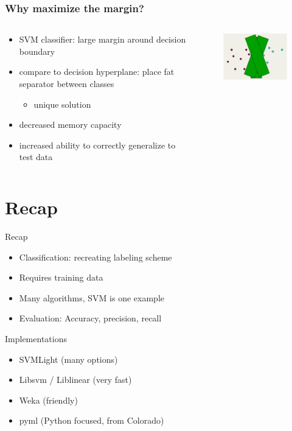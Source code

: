 \documentclass[compress]{beamer}
\newcommand{\1}{\mathbf{1}}
\begin{document}
\begin{frame}
\frametitle{Why maximize the margin?}
\begin{columns}[t]
\begin{column}{5.5cm}
\begin{itemize}
\item SVM classifier: large margin around decision boundary
\item compare to decision hyperplane: place fat separator between classes
\begin{itemize}
\item unique solution
\end{itemize}
\item decreased memory capacity
\item increased ability to correctly generalize to test data
\end{itemize}
\end{column}
\begin{column}{4.5cm}
\begin{figure}
\includegraphics[width=2.0in]{svm/band-aids}
\end{figure}
\end{column}
\end{columns}
\end{frame}


\section{Recap}

\begin{frame}{Recap}

	\begin{itemize}
		\item Classification: recreating labeling scheme
		\item Requires training data
		\item Many algorithms, SVM is one example
		\item Evaluation: Accuracy, precision, recall
	\end{itemize}

\end{frame}

\begin{frame}{Implementations}

		\begin{itemize}
			\item SVMLight (many options)
			\item Libsvm / Liblinear (very fast)
			\item Weka (friendly)
			\item pyml (Python focused, from Colorado)
		\end{itemize}

\end{frame}
\end{document}

